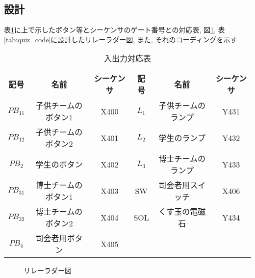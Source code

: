 \documentclass[titlepage]{jsarticle}
\begin{document}
  \subsection{設計}
    表\ref{tab:taiou}に上で示したボタン等とシーケンサのゲート番号との対応表,
    図\ref{fig:quiz_lad}, 表\ref{tab:quiz_code}に設計したリレーラダー図, また, それのコーディングを示す.
    \begin{table}[h]
      \caption{入出力対応表}
      \label{tab:taiou}
      \centering
      \begin{tabular}{c|c|c||c|c|c}
        \hline
        記号 &       名前 &             シーケンサ & 記号 &   名前 &            シーケンサ \\ \hline \hline
        $PB_{11}$ & 子供チームのボタン1 & X400 &     $L_1$ & 子供チームのランプ & Y431 \\
        $PB_{12}$ & 子供チームのボタン2 & X401 &     $L_2$ & 学生のランプ      & Y432 \\
        $PB_2$ &    学生のボタン &       X402 &     $L_3$ & 博士チームのランプ & Y433 \\
        $PB_{31}$ & 博士チームのボタン1 & X403 &     SW &    司会者用スイッチ   & X406 \\
        $PB_{32}$ & 博士チームのボタン2 & X404 &     SOL &   くす玉の電磁石    & Y434 \\
        $PB_4$ &    司会者用ボタン &     X405 & & & \\ \hline
      \end{tabular}
    \end{table}
    \begin{figure}[h]
      \centering
      \caption{リレーラダー図}
      \label{fig:quiz_lad}
    \end{figure}
\end{document}
